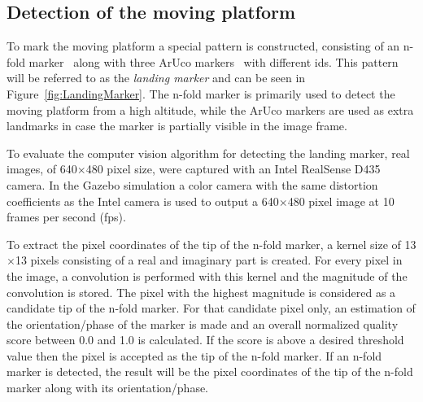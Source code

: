 \documentclass[conference]{IEEEtran}
\begin{document}
\subsection{Detection of the moving platform}
\label{sec:Detection}

To mark the moving platform a special pattern is constructed,
consisting of an n-fold marker~\cite{NfoldMarker} along with three
ArUco markers~\cite{ArUco_marker} with different ids. This pattern
will be referred to as the \emph{landing marker} and can be seen in
Figure~\ref{fig:LandingMarker}. The n-fold marker is primarily used to
detect the moving platform from a high altitude, while the ArUco
markers are used as extra landmarks in case the marker is partially
visible in the image frame.

To evaluate the computer vision algorithm for detecting the landing
marker, real images, of 640$\times$480 pixel size, were captured with
an Intel RealSense D435 camera. In the Gazebo simulation a color camera
with the same distortion coefficients as the Intel camera is used to
output a 640$\times$480 pixel image at 10 frames per second (fps).

To extract the pixel coordinates of the tip of the n-fold marker, a
kernel size of 13$\times$13 pixels consisting of a real and imaginary
part is created. For every pixel in the image, a convolution is
performed with this kernel and the magnitude of the convolution is
stored. The pixel with the highest magnitude is considered as a
candidate tip of the n-fold marker. For that candidate pixel only, an
estimation of the orientation/phase of the marker is made and an
overall normalized quality score between 0.0 and 1.0 is calculated. If
the score is above a desired threshold value then the pixel is
accepted as the tip of the n-fold marker. If an n-fold marker is
detected, the result will be the pixel coordinates of the tip of the
n-fold marker along with its orientation/phase.

\end{document}
